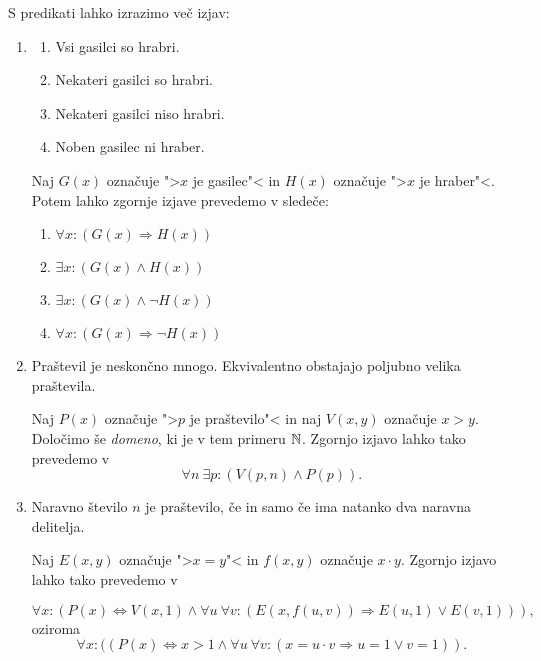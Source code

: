 \documentclass[12pt, a4paper]{article}
\renewcommand{\implies}{\Rightarrow}
\renewcommand{\iff}{\Leftrightarrow}
\begin{document}
\begin{zgled}
S predikati lahko izrazimo več izjav:

\begin{enumerate}
\item
\begin{multicols}{2}
\begin{enumerate}
\item Vsi gasilci so hrabri.
\item Nekateri gasilci so hrabri.
\item Nekateri gasilci niso hrabri.
\item Noben gasilec ni hraber.
\end{enumerate}
\end{multicols}

Naj $G(x)$ označuje ">$x$ je gasilec"< in $H(x)$ označuje ">$x$ je hraber"<. Potem lahko zgornje izjave prevedemo v sledeče:

\begin{multicols}{2}
\begin{enumerate}
\item $\forall x\colon(G(x)\implies H(x))$
\item $\exists x\colon(G(x)\land H(x))$
\item $\exists x\colon(G(x)\land\neg H(x))$
\item $\forall x\colon(G(x)\implies\neg H(x))$
\end{enumerate}
\end{multicols}

\item Praštevil je neskončno mnogo. Ekvivalentno obstajajo poljubno velika praštevila.

Naj $P(x)$ označuje ">$p$ je praštevilo"< in naj $V(x,y)$ označuje $x>y$. Določimo še \emph{domeno}, ki je v tem primeru $\mathbb{N}$. Zgornjo izjavo lahko tako prevedemo v
\[
\forall n~\exists p\colon(V(p,n) \land P(p)).
\]
\item Naravno število $n$ je praštevilo, če in samo če ima natanko dva naravna delitelja.

Naj $E(x, y)$ označuje ">$x=y$"< in $f(x,y)$ označuje $x\cdot y$. Zgornjo izjavo lahko tako prevedemo v

\[
\forall x\colon(P(x)\iff V(x,1)\land \forall u~\forall v\colon (E(x,f(u,v))\implies E(u,1)\lor E(v,1))),
\]
oziroma
\[
\forall x\colon((P(x)\iff x>1\land \forall u~\forall v\colon(x=u\cdot v\implies u=1\lor v=1)).
\]
\end{enumerate}
\end{zgled}
\end{document}
